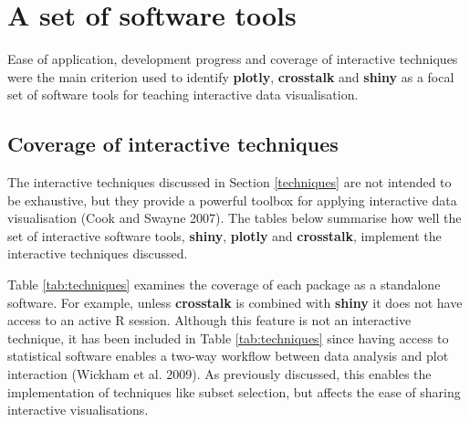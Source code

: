 \documentclass[]{book}
\theoremstyle{definition}
\theoremstyle{definition}
\theoremstyle{definition}
\theoremstyle{remark}
\begin{document}
\section{A set of software tools}\label{a-set-of-software-tools}

Ease of application, development progress and coverage of interactive
techniques were the main criterion used to identify \textbf{plotly},
\textbf{crosstalk} and \textbf{shiny} as a focal set of software tools
for teaching interactive data visualisation.

\subsection{Coverage of interactive
techniques}\label{coverage-of-interactive-techniques}

The interactive techniques discussed in Section \ref{techniques} are not
intended to be exhaustive, but they provide a powerful toolbox for
applying interactive data visualisation (Cook and Swayne 2007). The
tables below summarise how well the set of interactive software tools,
\textbf{shiny}, \textbf{plotly} and \textbf{crosstalk}, implement the
interactive techniques discussed.

Table \ref{tab:techniques} examines the coverage of each package as a
standalone software. For example, unless \textbf{crosstalk} is combined
with \textbf{shiny} it does not have access to an active R session.
Although this feature is not an interactive technique, it has been
included in Table \ref{tab:techniques} since having access to
statistical software enables a two-way workflow between data analysis
and plot interaction (Wickham et al. 2009). As previously discussed,
this enables the implementation of techniques like subset selection, but
affects the ease of sharing interactive visualisations.
\end{document}
